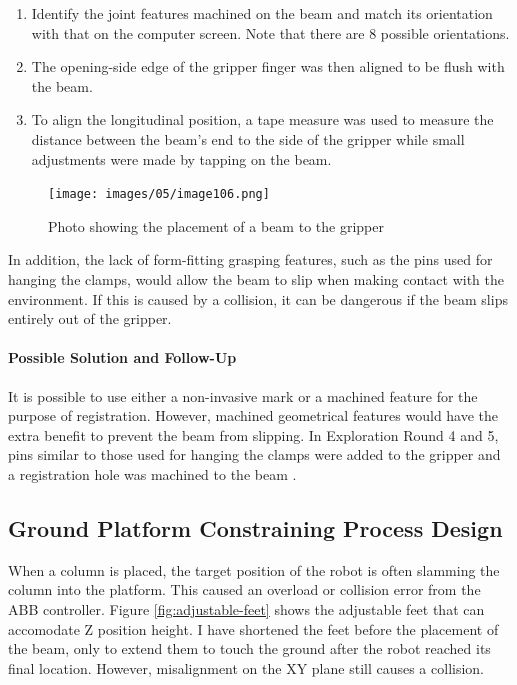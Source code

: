 \begin{enumerate}
    \item Identify the joint features machined on the beam and match its orientation with that on the computer screen. Note that there are 8 possible orientations.
    \item The opening-side edge of the gripper finger was then aligned to be flush with the beam.
    \item To align the longitudinal position, a tape measure was used to measure the distance between the beam’s end to the side of the gripper while small adjustments were made by tapping on the beam. 
\end{enumerate}

\begin{figure}
    \centering
    \texttt{[image: images/05/image106.png]}
    \caption{Photo showing the placement of a beam to the gripper}
    \label{fig:place-beam-fred}
\end{figure}

In addition, the lack of form-fitting grasping features, such as the pins used for hanging the clamps, would allow the beam to slip when making contact with the environment. If this is caused by a collision, it can be dangerous if the beam slips entirely out of the gripper.

\paragraph{Possible Solution and Follow-Up}

It is possible to use either a non-invasive mark or a machined feature for the purpose of registration. However, machined geometrical features would have the extra benefit to prevent the beam from slipping. In Exploration Round 4 and 5, pins similar to those used for hanging the clamps were added to the gripper and a registration hole was machined to the beam .

\subsection{Ground Platform Constraining Process Design}
\label{subsection:exploration-2-ground-platform-constraining-process-design}

When a column is placed, the target position of the robot is often slamming the column into the platform. This caused an overload or collision error from the ABB controller. Figure \ref{fig:adjustable-feet} shows the adjustable feet that can accomodate Z position height. I have shortened the feet before the placement of the beam, only to extend them to touch the ground after the robot reached its final location. However, misalignment on the XY plane still causes a collision.

